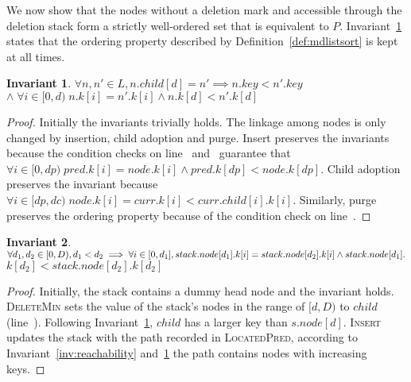 \documentclass[10pt,journal,letterpaper,compsoc]{IEEEtran}
\newtheorem{lemma}{Lemma}
\newtheorem{invariant}{Invariant}
\begin{document}

We now show that the nodes without a deletion mark and accessible through the deletion stack form a strictly well-ordered set that is equivalent to $P$.
Invariant~\ref{inv:order} states that the ordering property described by Definition~\ref{def:mdlistsort} is kept at all times.

\begin{invariant} \label{inv:order}
    $\forall n,n' \in L, n.child[d]=n' \implies n.key < n'.key$ $\land\;\forall i \in [0, d)\; n.k[i] = n'.k[i] \land n.k[d]<n'.k[d]$
\end{invariant}
\begin{proof}
    Initially the invariants trivially holds.
    The linkage among nodes is only changed by insertion, child adoption and purge.
    Insert preserves the invariants because the condition checks on line~ and~ guarantee that $\forall i \in [0, dp)\; pred.k[i] = node.k[i] \land pred.k[dp]<node.k[dp]$.
    Child adoption preserves the invariant because $\forall i \in [dp, dc)\; node.k[i] = curr.k[i] < curr.child[i].k[i]$.
    Similarly, purge preserves the ordering property because of the condition check on line~.
\end{proof}

\begin{invariant} \label{inv:stackorder}
    $\forall d_1,d_2 \in [0,D), d_1<d_2 \implies \forall i \in [0,d_1],\linebreak stack.node[d_1].k[i]=stack.node[d_2].k[i] \land stack.node[d_1].$ $k[d_2] < stack.node[d_2].k[d_2]$
\end{invariant}
\begin{proof}
    Initially, the stack contains a dummy head node and the invariant holds.
    \textsc{DeleteMin} sets the value of the stack's nodes in the range of $[d,D)$ to $child$ (line~).
    Following Invariant~\ref{inv:order}, $child$ has a larger key than $s.node[d]$.
    \textsc{Insert} updates the stack with the path recorded in \textsc{LocatedPred}, according to Invariant~\ref{inv:reachability} and~\ref{inv:order} the path contains nodes with increasing keys.
\end{proof}
\end{document}
